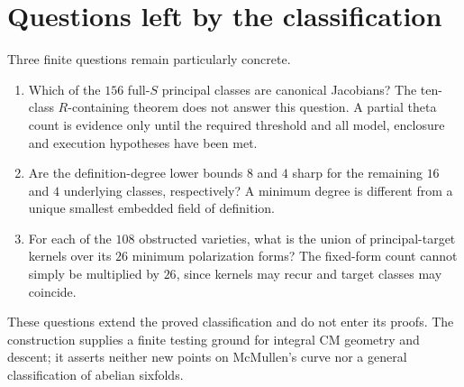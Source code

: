 \section{Questions left by the classification}
Three finite questions remain particularly concrete.
\begin{enumerate}[leftmargin=*]
\item Which of the $156$ full-$S$ principal classes are canonical Jacobians?
The ten-class $R$-containing theorem does not answer this question.
A partial theta count is evidence only until the required threshold and
all model, enclosure and execution hypotheses have been met.
\item Are the definition-degree lower bounds $8$ and $4$ sharp for the
remaining $16$ and $4$ underlying classes, respectively? A minimum degree
is different from a unique smallest embedded field of definition.
\item For each of the $108$ obstructed varieties, what is the union of
principal-target kernels over its $26$ minimum polarization forms?
The fixed-form count cannot simply be multiplied by $26$, since kernels
may recur and target classes may coincide.
\end{enumerate}
These questions extend the proved classification and do not enter its
proofs. The construction supplies a finite testing ground for integral
CM geometry and descent; it asserts neither new points on McMullen's
curve nor a general classification of abelian sixfolds.
